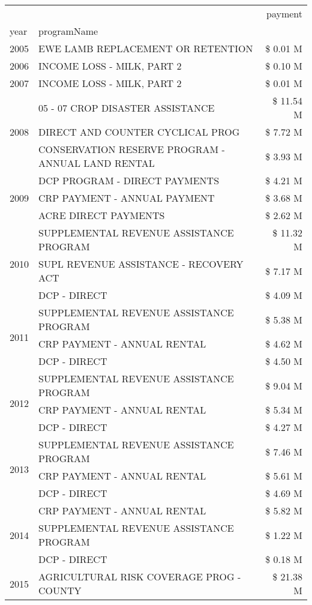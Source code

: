 \begin{tabular}{llr}
\toprule
 &  & payment \\
year & programName &  \\
\midrule
2005 & EWE LAMB REPLACEMENT OR RETENTION & \$ 0.01 M \\
\cline{1-3}
2006 & INCOME LOSS - MILK, PART 2 & \$ 0.10 M \\
\cline{1-3}
2007 & INCOME LOSS - MILK, PART 2 & \$ 0.01 M \\
\cline{1-3}
\multirow[t]{3}{*}{2008} & 05 - 07 CROP DISASTER ASSISTANCE & \$ 11.54 M \\
 & DIRECT AND COUNTER CYCLICAL PROG & \$ 7.72 M \\
 & CONSERVATION RESERVE PROGRAM - ANNUAL LAND RENTAL & \$ 3.93 M \\
\cline{1-3}
\multirow[t]{3}{*}{2009} & DCP PROGRAM - DIRECT PAYMENTS & \$ 4.21 M \\
 & CRP PAYMENT - ANNUAL PAYMENT & \$ 3.68 M \\
 & ACRE DIRECT PAYMENTS & \$ 2.62 M \\
\cline{1-3}
\multirow[t]{3}{*}{2010} & SUPPLEMENTAL REVENUE ASSISTANCE PROGRAM & \$ 11.32 M \\
 & SUPL REVENUE ASSISTANCE - RECOVERY ACT & \$ 7.17 M \\
 & DCP - DIRECT & \$ 4.09 M \\
\cline{1-3}
\multirow[t]{3}{*}{2011} & SUPPLEMENTAL REVENUE ASSISTANCE PROGRAM & \$ 5.38 M \\
 & CRP PAYMENT - ANNUAL RENTAL & \$ 4.62 M \\
 & DCP - DIRECT & \$ 4.50 M \\
\cline{1-3}
\multirow[t]{3}{*}{2012} & SUPPLEMENTAL REVENUE ASSISTANCE PROGRAM & \$ 9.04 M \\
 & CRP PAYMENT - ANNUAL RENTAL & \$ 5.34 M \\
 & DCP - DIRECT & \$ 4.27 M \\
\cline{1-3}
\multirow[t]{3}{*}{2013} & SUPPLEMENTAL REVENUE ASSISTANCE PROGRAM & \$ 7.46 M \\
 & CRP PAYMENT - ANNUAL RENTAL & \$ 5.61 M \\
 & DCP - DIRECT & \$ 4.69 M \\
\cline{1-3}
\multirow[t]{3}{*}{2014} & CRP PAYMENT - ANNUAL RENTAL & \$ 5.82 M \\
 & SUPPLEMENTAL REVENUE ASSISTANCE PROGRAM & \$ 1.22 M \\
 & DCP - DIRECT & \$ 0.18 M \\
\cline{1-3}
\multirow[t]{3}{*}{2015} & AGRICULTURAL RISK COVERAGE PROG - COUNTY & \$ 21.38 M \\

\end{tabular}
